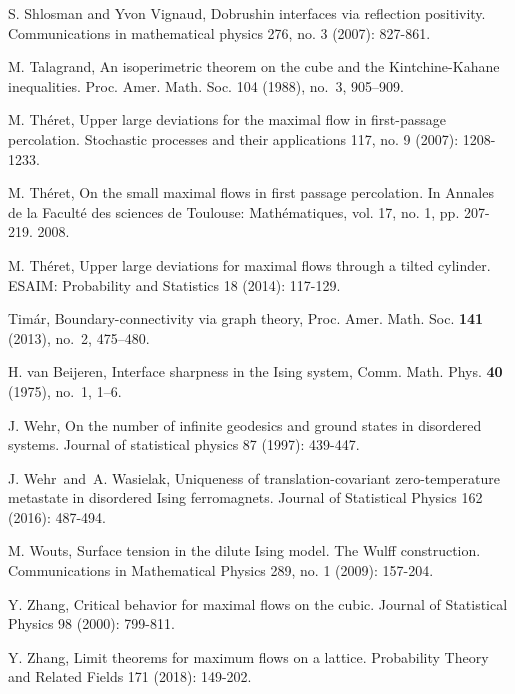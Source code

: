 \documentclass[11pt, reqno]{amsart}
\numberwithin{equation}{section}
\begin{document}
\begin{thebibliography}{}
S. Shlosman and Yvon Vignaud, Dobrushin interfaces via reflection positivity. Communications in mathematical physics 276, no. 3 (2007): 827-861.

M. Talagrand, An isoperimetric theorem on the cube and the Kintchine-Kahane inequalities.
Proc. Amer. Math. Soc. 104 (1988), no.~3, 905–909.

M. Th\'eret, Upper large deviations for the maximal flow in first-passage percolation. Stochastic processes and their applications 117, no. 9 (2007): 1208-1233.

M. Th\'eret, On the small maximal flows in first passage percolation. In Annales de la Faculté des sciences de Toulouse: Mathématiques, vol. 17, no. 1, pp. 207-219. 2008.

M. Th\'eret, Upper large deviations for maximal flows through a tilted cylinder. ESAIM: Probability and Statistics 18 (2014): 117-129.

Tim\'{a}r, Boundary-connectivity via graph theory, Proc. Amer. Math. Soc. {\bf 141} (2013), no.~2, 475--480. 

H. van Beijeren, Interface sharpness in the Ising system, Comm. Math. Phys. {\bf 40} (1975), no.~1, 1--6. 

J. Wehr, On the number of infinite geodesics and ground states in disordered systems. Journal of statistical physics 87 (1997): 439-447.

J. Wehr\ and\ A. Wasielak, Uniqueness of translation-covariant zero-temperature metastate in disordered Ising ferromagnets. Journal of Statistical Physics 162 (2016): 487-494.

M. Wouts, Surface tension in the dilute Ising model. The Wulff construction. Communications in Mathematical Physics 289, no. 1 (2009): 157-204.

Y. Zhang, Critical behavior for maximal flows on the cubic. 
Journal of Statistical Physics 98 (2000): 799-811.

Y. Zhang, Limit theorems for maximum flows on a lattice. Probability Theory and Related Fields 171 (2018): 149-202.

\end{thebibliography}
\end{document}
